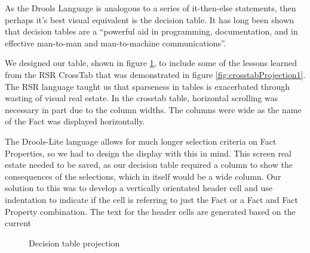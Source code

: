 As the Drools Language is analogous to a series of it-then-else statements, then perhaps it's best visual equivalent is the decision table.
It has long been shown that decision tables are a ``powerful aid in programming, documentation, and in effective man-to-man and man-to-machine communications''\cite{pooch1974translation}.

We designed our table, shown in figure \ref{fig:decisionTableProjection}, to include some of the lessons learned from the RSR CrossTab that was demonstrated in figure \ref{fig:crosstabProjection1}.
The RSR language taught us that sparseness in tables is exacerbated through wasting of visual real estate.
In the crosstab table, horizontal scrolling was necessary in part due to the column widths.
The columns were wide as the name of the Fact was displayed horizontally.

The Drools-Lite language allows for much longer selection criteria on Fact Properties, so we had to design the display with this in mind.
This screen real estate needed to be saved, as our decision table required a column to show the consequences of the selections, which in itself would be a wide column.
Our solution to this was to develop a vertically orientated header cell and use indentation to indicate if the cell is referring to just the Fact or a Fact and Fact Property combination.
The text for the header cells are generated based on the current


\begin{figure}[h]
    \centering
    \caption{Decision table projection}
    \label{fig:decisionTableProjection}
\end{figure}

